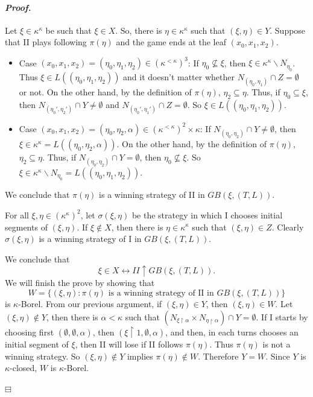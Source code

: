 \documentclass[12pt,a4paper]{amsart}
\theoremstyle{definition}
\theoremstyle{remark}
\renewcommand{\restriction}{\mathbin\upharpoonright}
\newenvironment{cproof}{\paragraph{\emph{Proof.\,}}}{\hfill{$\boxminus$}\par\vspace{2mm}}
\begin{document}
\begin{cproof}
Let $\xi\in \kappa^\kappa$ be such that $\xi\in X$. So, there is $\eta\in \kappa^\kappa$ such that $(\xi,\eta)\in Y$. Suppose that II plays following $\pi(\eta)$ and the game ends at the leaf $(x_0,x_1,x_2)$. 
\begin{itemize}
    \item Case $(x_0,x_1,x_2)=(\eta_0,\eta_1,\eta_2)\in (\kappa^{<\kappa})^3$: If $\eta_0\not\subseteq\xi$, then $\xi\in \kappa^\kappa\backslash N_{\eta_0}$. Thus $\xi\in L((\eta_0,\eta_1,\eta_2))$ and it doesn't matter whether $N_{(\eta_0,\eta_1)}\cap Z=\emptyset$ or not. On the other hand, by the definition of $\pi(\eta)$, $\eta_2\subseteq \eta$. Thus, if $\eta_0\subseteq\xi$, then $N_{(\eta_0',\eta_2')}\cap Y\neq\emptyset$ and $N_{(\eta_0',\eta_1')}\cap Z=\emptyset$. So $\xi\in L((\eta_0,\eta_1,\eta_2))$.
    \item Case $(x_0,x_1,x_2)=(\eta_0,\eta_2,\alpha)\in (\kappa^{<\kappa})^2\times\kappa$: If $N_{(\eta_0,\eta_2)}\cap Y\neq\emptyset$, then $\xi\in \kappa^\kappa=L((\eta_0,\eta_2,\alpha))$. On the other hand, by the definition of $\pi(\eta)$, $\eta_2\subseteq \eta$. Thus, if $N_{(\eta_0,\eta_2)}\cap Y=\emptyset$, then $\eta_0\not\subseteq\xi$. So $\xi\in \kappa^\kappa\backslash N_{\eta_0}=L((\eta_0,\eta_1,\eta_2))$.
\end{itemize}
We conclude that $\pi(\eta)$ is a winning strategy of II in $GB(\xi,(T,L))$.

For all $\xi,\eta\in(\kappa^\kappa)^2$, let $\sigma(\xi,\eta)$ be the strategy in which I chooses initial segments of $(\xi,\eta)$. If $\xi\notin X$, then there is $\eta\in \kappa^\kappa$ such that $(\xi,\eta)\in Z$. Clearly $\sigma(\xi,\eta)$ is a winning strategy of I in $GB(\xi,(T,L))$.

We conclude that $$\xi\in X\leftrightarrow II\uparrow GB(\xi,(T,L)).$$ 
We will finish the prove by showing that $$W=\{(\xi,\eta) : \pi(\eta)\mbox{ is a winning strategy of II in }GB(\xi,(T,L))\}$$ is $\kappa$-Borel. 
From our previous argument, if $(\xi,\eta)\in Y$, then $(\xi,\eta)\in W$. Let $(\xi,\eta)\notin Y$, then there is $\alpha<\kappa$ such that $(N_{\xi\restriction \alpha}\times N_{\eta\restriction \alpha})\cap Y=\emptyset$. If I starts by choosing first $(\emptyset,\emptyset,\alpha)$, then $(\xi\restriction 1,\emptyset,\alpha)$, and then, in each turns chooses an initial segment of $\xi$, then II will lose if II follows $\pi(\eta)$. Thus $\pi(\eta)$ is not a winning strategy. So $(\xi,\eta)\notin Y$ implies $\pi(\eta)\notin W$. Therefore $Y=W$. Since $Y$ is $\kappa$-closed, $W$ is $\kappa$-Borel.

\end{cproof}
\end{document}
